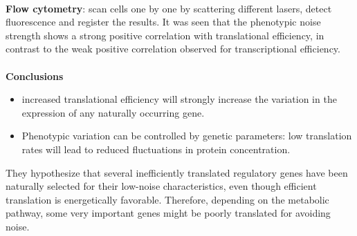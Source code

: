 \\
\noindent
\textbf{Flow cytometry}: scan cells one by one by scattering different lasers, detect fluorescence and register the results.  It was seen that the phenotypic noise strength shows a strong positive correlation with translational efficiency, in contrast to the weak positive correlation observed for transcriptional efficiency.
\\
\\
\noindent
\textbf{Conclusions}
\begin{itemize}
\item increased translational efficiency will strongly increase the variation in the expression of any naturally occurring gene. 
\item Phenotypic variation can be controlled by genetic parameters: low translation rates will lead to reduced fluctuations in protein concentration. 
\end{itemize}
\noindent
They hypothesize that several inefficiently translated regulatory genes have been naturally selected for their low-noise characteristics, even though efficient translation is energetically favorable. Therefore, depending on the metabolic pathway, some very important genes might be poorly translated for avoiding noise.

